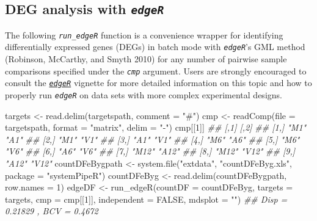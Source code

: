 \documentclass[14pt,]{article}
\newcommand{\hlnum}[1]{\textcolor[rgb]{0.816,0.125,0.439}{#1}}%
\newcommand{\hlstr}[1]{\textcolor[rgb]{0.251,0.627,0.251}{#1}}%
\newcommand{\hlcom}[1]{\textcolor[rgb]{0.502,0.502,0.502}{\textit{#1}}}%
\newcommand{\hlstd}[1]{\textcolor[rgb]{0.251,0.251,0.251}{#1}}%
\newcommand{\hlkwc}[1]{\textcolor[rgb]{0.251,0.251,0.251}{#1}}%
\newcommand{\hlkwd}[1]{\textcolor[rgb]{0.878,0.439,0.125}{#1}}%
\newenvironment{Shaded}{\begin{myshaded}}{\end{myshaded}}
\newcommand{\KeywordTok}[1]{\hlkwd{#1}}
\newcommand{\DataTypeTok}[1]{\hlkwc{#1}}
\newcommand{\DecValTok}[1]{\hlnum{#1}}
\newcommand{\StringTok}[1]{\hlstr{#1}}
\newcommand{\CommentTok}[1]{\hlcom{#1}}
\newcommand{\OtherTok}[1]{{#1}}
\newcommand{\NormalTok}[1]{\hlstd{#1}}
\begin{document}
\hypertarget{deg-analysis-with-edger}{%
\subsection{\texorpdfstring{DEG analysis with \emph{\texttt{edgeR}}}{DEG analysis with edgeR}}\label{deg-analysis-with-edger}}

The following \emph{\texttt{run\_edgeR}} function is a convenience wrapper for
identifying differentially expressed genes (DEGs) in batch mode with
\emph{\texttt{edgeR}}'s GML method (Robinson, McCarthy, and Smyth 2010) for any number of
pairwise sample comparisons specified under the \emph{\texttt{cmp}} argument. Users
are strongly encouraged to consult the
\href{/href\%7Bhttp://www.bioconductor.org/packages/devel/bioc/vignettes/edgeR/inst/doc/edgeRUsersGuide.pdf}{\emph{\texttt{edgeR}}} vignette
for more detailed information on this topic and how to properly run \emph{\texttt{edgeR}}
on data sets with more complex experimental designs.

\begin{Shaded}
\begin{Highlighting}[]
\NormalTok{targets <-}\StringTok{ }\KeywordTok{read.delim}\NormalTok{(targetspath, }\DataTypeTok{comment =} \StringTok{"#"}\NormalTok{)}
\NormalTok{cmp <-}\StringTok{ }\KeywordTok{readComp}\NormalTok{(}\DataTypeTok{file =}\NormalTok{ targetspath, }\DataTypeTok{format =} \StringTok{"matrix"}\NormalTok{, }\DataTypeTok{delim =} \StringTok{"-"}\NormalTok{)}
\NormalTok{cmp[[}\DecValTok{1}\NormalTok{]]}
\CommentTok{##       [,1]  [,2] }
\CommentTok{##  [1,] "M1"  "A1" }
\CommentTok{##  [2,] "M1"  "V1" }
\CommentTok{##  [3,] "A1"  "V1" }
\CommentTok{##  [4,] "M6"  "A6" }
\CommentTok{##  [5,] "M6"  "V6" }
\CommentTok{##  [6,] "A6"  "V6" }
\CommentTok{##  [7,] "M12" "A12"}
\CommentTok{##  [8,] "M12" "V12"}
\CommentTok{##  [9,] "A12" "V12"}
\NormalTok{countDFeBygpath <-}\StringTok{ }\KeywordTok{system.file}\NormalTok{(}\StringTok{"extdata"}\NormalTok{, }\StringTok{"countDFeByg.xls"}\NormalTok{, }\DataTypeTok{package =} \StringTok{"systemPipeR"}\NormalTok{)}
\NormalTok{countDFeByg <-}\StringTok{ }\KeywordTok{read.delim}\NormalTok{(countDFeBygpath, }\DataTypeTok{row.names =} \DecValTok{1}\NormalTok{)}
\NormalTok{edgeDF <-}\StringTok{ }\KeywordTok{run_edgeR}\NormalTok{(}\DataTypeTok{countDF =}\NormalTok{ countDFeByg, }\DataTypeTok{targets =}\NormalTok{ targets, }\DataTypeTok{cmp =}\NormalTok{ cmp[[}\DecValTok{1}\NormalTok{]], }\DataTypeTok{independent =} \OtherTok{FALSE}\NormalTok{, }
    \DataTypeTok{mdsplot =} \StringTok{""}\NormalTok{)}
\CommentTok{## Disp = 0.21829 , BCV = 0.4672}
\end{Highlighting}
\end{Shaded}
\end{document}
